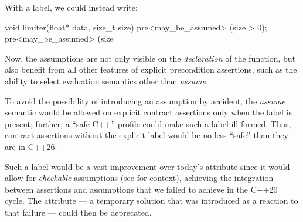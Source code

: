 With a  label, we could instead write:
\begin{codeblock}
void limiter(float* data, size_t size)
  pre<may_be_assumed> (size > 0);
  pre<may_be_assumed> (size %
\end{codeblock}
Now, the assumptions are not only visible on the \emph{declaration} of the function, but also benefit from all other features of explicit precondition assertions, such as the ability to select evaluation semantics other than \emph{assume}.

To avoid the possibility of introducing an assumption by accident, the \emph{assume} semantic would be allowed on explicit contract assertions only when the \mbox{} label is present; further, a ``safe C++'' profile could make such a label ill-formed. Thus, contract assertions without the explicit label would be no less ``safe'' than they are in C++26.

Such a label would be a vast improvement over today's \tcode{[[assume]]} attribute since it would allow for \emph{checkable} assumptions (see \cite{P2064R0} for context), achieving the integration between assertions and assumptions that we failed to achieve in the C++20 cycle. The \tcode{[[assume]]} attribute --- a temporary solution that was introduced as a reaction to that failure --- could then be deprecated.



